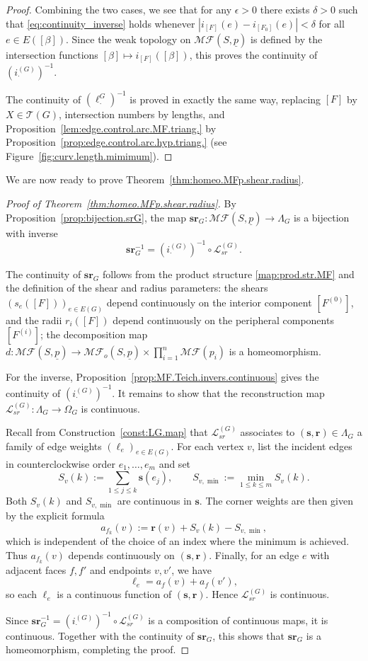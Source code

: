 \documentclass[11pt, letterpaper]{amsart}
\theoremstyle{definition}
\theoremstyle{remark}
\newcommand{\up}{\underline{p}}
\newcommand{\Sp}{(S,\up)}
\newcommand{\iG}{i^{(G)}}
\newcommand{\cMF}{\mathcal{MF}}
\newcommand{\cMFp}{\mathcal{MF} (S,\up)}
\newcommand{\cT}{\mathcal{T}}
\numberwithin{equation}{section}
\begin{document}
\begin{proof}
\smallskip
Combining the two cases, we see that for any \(\epsilon>0\) there exists
\(\delta>0\) such that \eqref{eq:continuity_inverse} holds whenever
\(|i_{[F]}(e)-i_{[F_0]}(e)|<\delta\) for all \(e\in E([\beta])\).
Since the weak topology on \(\cMFp\) is defined by the intersection functions
\([\beta]\mapsto i_{[F]}([\beta])\), this proves the continuity of
\((\iG_{\cdot})^{-1}\).

The continuity of \((\ell^G_{\cdot})^{-1}\) is proved in exactly the same way,
replacing \([F]\) by \(X\in\cT(G)\), intersection numbers by lengths, and
Proposition~\ref{lem:edge.control.arc.MF.triang.} by
Proposition~\ref{prop:edge.control.arc.hyp.triang.}
(see Figure~\ref{fig:curv.length.mimimum}).
\end{proof}

We are now ready to prove Theorem~\ref{thm:homeo.MFp.shear.radius}.

\begin{proof}[Proof of Theorem~\ref{thm:homeo.MFp.shear.radius}]
By Proposition~\ref{prop:bijection.srG}, the map
\(\mathbf{sr}_G : \cMFp\to\Lambda_G\) is a bijection with inverse
\[
\mathbf{sr}_G^{-1} = (\iG_{\cdot})^{-1}\circ\mathcal{L}^{(G)}_{sr}.
\]

The continuity of \(\mathbf{sr}_G\) follows from the product structure
\eqref{map:prod.str.MF} and the definition of the shear and radius parameters:
the shears \((s_e([F]))_{e\in E(G)}\) depend continuously on the interior
component \([F^{(0)}]\), and the radii \(r_i([F])\) depend continuously on the
peripheral components \([F^{(i)}]\); the decomposition map
\(d:\cMFp\to\cMF_o\Sp\times\prod_{i=1}^n\cMF(p_i)\) is a homeomorphism.

For the inverse, Proposition~\ref{prop:MF.Teich.invers.continuous} gives the
continuity of \((\iG_{\cdot})^{-1}\).
It remains to show that the reconstruction map
\(\mathcal{L}^{(G)}_{sr}:\Lambda_G\to\Omega_G\) is continuous.

Recall from Construction~\ref{const:LG.map} that \(\mathcal{L}^{(G)}_{sr}\)
associates to \((\mathbf{s},\mathbf{r})\in\Lambda_G\) a family of edge weights
\((\ell_e)_{e\in E(G)}\).
For each vertex \(v\), list the incident edges in counterclockwise order
\(e_1,\dots,e_m\) and set
\[
S_v(k) := \sum_{1\le j\le k} \mathbf{s}(e_j),\qquad
S_{v,\min} := \min_{1\le k\le m} S_v(k).
\]
Both \(S_v(k)\) and \(S_{v,\min}\) are continuous in \(\mathbf{s}\).
The corner weights are then given by the explicit formula
\[
a_{f_k}(v) := \mathbf{r}(v) + S_v(k) - S_{v,\min},
\]
which is independent of the choice of an index where the minimum is achieved.
Thus \(a_{f_k}(v)\) depends continuously on \((\mathbf{s},\mathbf{r})\).
Finally, for an edge \(e\) with adjacent faces \(f,f'\) and endpoints \(v,v'\),
we have
\[
\ell_e = a_f(v)+a_f(v'),
\]
so each \(\ell_e\) is a continuous function of \((\mathbf{s},\mathbf{r})\).
Hence \(\mathcal{L}^{(G)}_{sr}\) is continuous.

Since \(\mathbf{sr}_G^{-1}=(\iG_{\cdot})^{-1}\circ\mathcal{L}^{(G)}_{sr}\) is a
composition of continuous maps, it is continuous.
Together with the continuity of \(\mathbf{sr}_G\), this shows that
\(\mathbf{sr}_G\) is a homeomorphism, completing the proof.
\end{proof}
\end{document}
